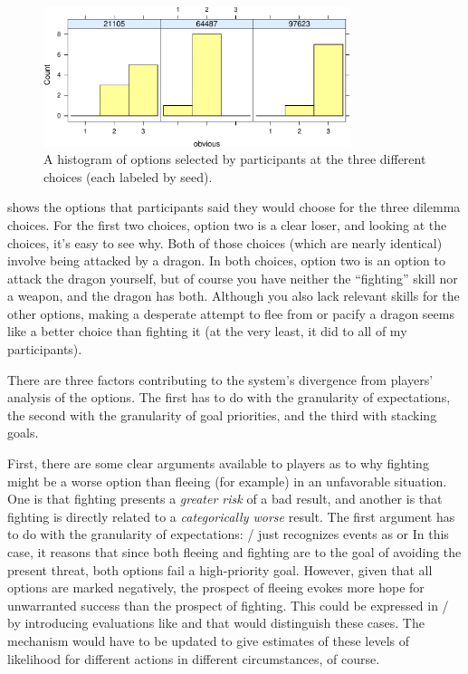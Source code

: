 \begin{figure}[!h]
  \centering
  \includegraphics[width=0.8\textwidth,page=3]{fig/choices-cropped.pdf}
  \caption[Histogram of option preferences for ``dilemma'' choices]{A histogram of options selected by participants at the three different \dlm{} choices (each labeled by seed).}
  \label{fig:e1-dilchoices}
\end{figure}


 shows the options that participants said they would choose for the three dilemma choices.
%
For the first two choices, option two is a clear loser, and looking at the choices, it's easy to see why.
%
Both of those choices (which are nearly identical) involve being attacked by a dragon.
%
In both choices, option two is an option to attack the dragon yourself, but of course you have neither the ``fighting'' skill nor a weapon, and the dragon has both.
%
Although you also lack relevant skills for the other options, making a desperate attempt to flee from or pacify a dragon seems like a better choice than fighting it (at the very least, it did to all of my participants).


There are three factors contributing to the system's divergence from players' analysis of the options.
%
The first has to do with the granularity of expectations, the second with the granularity of goal priorities, and the third with stacking goals.


First, there are some clear arguments available to players as to why fighting might be a worse option than fleeing (for example) in an unfavorable situation.
%
One is that fighting presents a \emph{greater risk} of a bad result, and another is that fighting is directly related to a \emph{categorically worse} result.
%
The first argument has to do with the granularity of expectations: \dunyazad/ just recognizes events as   or 
%
In this case, it reasons that since both fleeing and fighting are  to  the goal of avoiding the present threat, both options fail a high-priority goal.
%
However, given that all options are marked negatively, the prospect of fleeing evokes more hope for unwarranted success than the prospect of fighting.
%
This could be expressed in \dunyazad/ by introducing evaluations like  and  that would distinguish these cases.
%
The  mechanism would have to be updated to give estimates of these levels of likelihood for different actions in different circumstances, of course.


